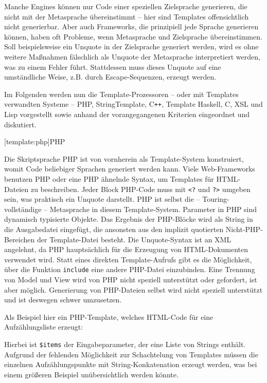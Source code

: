 \documentclass[11pt, a4paper, bibgerm]{scrbook}
\newenvironment{DIFnomarkup}{}{}
\newcommand\icode[1]{\lstinline?#1?}
\newcommand\phpo{\lstinline+<?+}
\newcommand\phpc{\lstinline+?>+}
\newcommand\lsection{}
\newcommand{\cpp}{C\texttt{++}}
\begin{document}
Manche Engines können nur Code einer speziellen Zielsprache generieren,
die nicht mit der Metasprache übereinstimmt -- hier sind Templates
offensichtlich nicht generierbar. Aber auch Frameworks, die prinzipiell
jede Sprache generieren können, haben oft Probleme, wenn Metasprache und
Zielsprache übereinstimmen. Soll beispielsweise ein Unquote in der
Zielsprache generiert werden, wird es ohne weitere Maßnahmen fälschlich
als Unquote der Metasprache interpretiert werden, was zu einem Fehler
führt. Stattdessen muss dieses Unquote auf eine umständliche Weise,
z.B. durch Escape-Sequenzen, erzeugt werden.

\medskip

Im Folgenden werden nun die Template-Prozessoren -- oder mit Templates
verwandten Systeme -- PHP, StringTemplate, \cpp{}, Template Haskell, C, XSL
und Lisp vorgestellt sowie anhand der vorangegangenen Kriterien
eingeordnet und diskutiert.

\lsection[template:php]{PHP}

Die Skriptsprache PHP ist von vornherein als Template-System
konstruiert, womit Code beliebiger Sprachen generiert werden kann. Viele
Web-Frameworks benutzen PHP oder eine PHP ähnelnde Syntax, um Templates
für HTML-Dateien zu beschreiben. Jeder Block PHP-Code muss mit \phpo{}
und \phpc{} umgeben sein, was praktisch ein Unquote darstellt. PHP ist
selbst die -- Touring-vollständige -- Metasprache in diesem
Template-System. Parameter in PHP sind dynamisch typisierte Objekte. Das
Ergebnis der PHP-Blöcke wird als String in die Ausgabedatei eingefügt,
die ansonsten aus den implizit quotierten Nicht-PHP-Bereichen der
Template-Datei besteht. Die Unquote-Syntax ist an XML angelehnt, da PHP
hauptsächlich für die Erzeugung von HTML-Dokumenten verwendet
wird. Statt eines direkten Template-Aufrufs gibt es die Möglichkeit,
über die Funktion \icode{include} eine andere PHP-Datei
einzubinden. Eine Trennung von Model und View wird von PHP nicht
speziell unterstützt oder gefordert, ist aber möglich. Generierung von
PHP-Dateien selbst wird nicht speziell unterstützt und ist deswegen
schwer umzusetzen.

Als Beispiel hier ein PHP-Template, welches HTML-Code für eine
Aufzählungsliste erzeugt:
\begin{DIFnomarkup}\end{DIFnomarkup} %
Hierbei ist \icode{$items} %
 der Eingabeparameter, der eine Liste von
Strings enthält.  Aufgrund der fehlenden Möglichkeit zur Schachtelung
von Templates müssen die einzelnen Aufzählungspunkte mit
String-Konkatenation erzeugt werden, was bei einem größeren Beispiel
unübersichtlich werden könnte.
\end{document}
